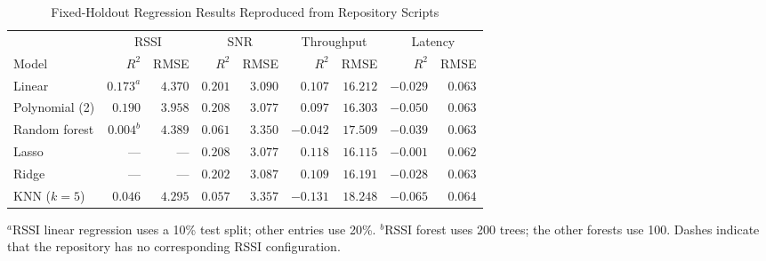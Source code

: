 \begin{table}[t]
\caption{Fixed-Holdout Regression Results Reproduced from Repository Scripts}
\label{tab:model-results}
\centering
\footnotesize
\begin{tabular}{lrr|rr|rr|rr}
\toprule
&\multicolumn{2}{c|}{RSSI}&\multicolumn{2}{c|}{SNR}&\multicolumn{2}{c|}{Throughput}&\multicolumn{2}{c}{Latency}\\
Model & $R^2$ & RMSE & $R^2$ & RMSE & $R^2$ & RMSE & $R^2$ & RMSE\\
\midrule
Linear & $0.173^{a}$ & $4.370$ & $0.201$ & $3.090$ & $0.107$ & $16.212$ & $-0.029$ & $0.063$\\
Polynomial (2) & $0.190$ & $3.958$ & $0.208$ & $3.077$ & $0.097$ & $16.303$ & $-0.050$ & $0.063$\\
Random forest & $0.004^{b}$ & $4.389$ & $0.061$ & $3.350$ & $-0.042$ & $17.509$ & $-0.039$ & $0.063$\\
Lasso & --- & --- & $0.208$ & $3.077$ & $0.118$ & $16.115$ & $-0.001$ & $0.062$\\
Ridge & --- & --- & $0.202$ & $3.087$ & $0.109$ & $16.191$ & $-0.028$ & $0.063$\\
KNN ($k=5$) & $0.046$ & $4.295$ & $0.057$ & $3.357$ & $-0.131$ & $18.248$ & $-0.065$ & $0.064$\\
\bottomrule
\end{tabular}

\raggedright\scriptsize $^{a}$RSSI linear regression uses a 10\% test split; other entries use 20\%. $^{b}$RSSI forest uses 200 trees; the other forests use 100. Dashes indicate that the repository has no corresponding RSSI configuration.
\end{table}
